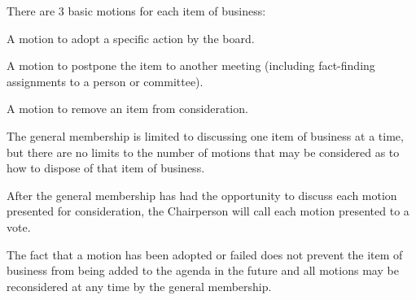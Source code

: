 \documentclass[12pt,a4paper]{article}
\begin{document}
\begin{constitutionlist}
\item There are 3 basic motions for each item of business:

\begin{constitutionlist}
\item A motion to adopt a specific action by the board.

\item A motion to postpone the item to another meeting (including fact-finding assignments to a person or committee).

\item A motion to remove an item from consideration.
\end{constitutionlist}

\item The general membership is limited to discussing one item of business at a time, but there are no limits to the number of motions that may be considered as to how to dispose of that item of business.

\item After the general membership has had the opportunity to discuss each motion presented for consideration, the Chairperson will call each motion presented to a vote.

\item The fact that a motion has been adopted or failed does not prevent the item of business from being added to the agenda in the future and all motions may be reconsidered at any time by the general membership.
\end{constitutionlist}
\end{document}
